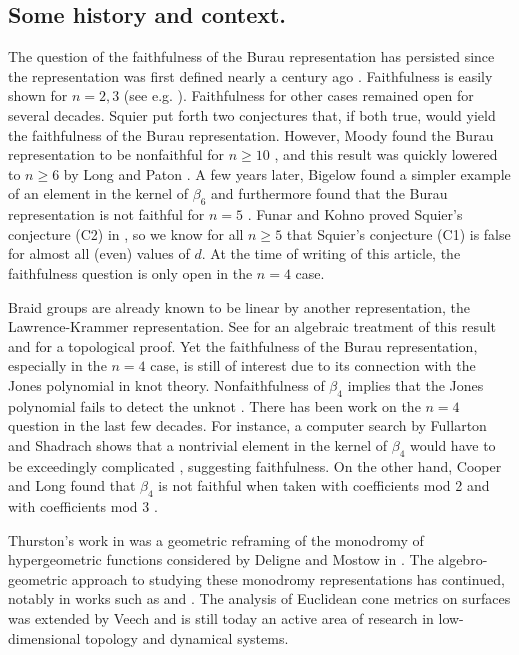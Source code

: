 \documentclass{amsart}
\begin{document}
    \subsection*{Some history and context.} The question of the faithfulness of the Burau representation has persisted since the representation was first defined nearly a century ago \cite{Burau1935UberVerkettungen}. Faithfulness is easily shown for $n=2,3$ (see e.g. \cite[Theorem 3.15]{Birman1975BraidsAM-82}). Faithfulness for other cases remained open for several decades. Squier put forth two conjectures \cite[(C1) and (C2)]{Squier1984TheUnitary} that, if both true, would yield the faithfulness of the Burau representation. However, Moody found the Burau representation to be nonfaithful for $n \geq 10$ \cite{Moody1993TheRepresentation}, and this result was quickly lowered to $n \geq 6$ by Long and Paton \cite{Long1993The6}. A few years later, Bigelow found a simpler example of an element in the kernel of $\beta_6$ and furthermore found that the Burau representation is not faithful for $n=5$ \cite{Bigelow1999The5}. Funar and Kohno proved Squier's conjecture (C2) in \cite{Funar2014OnUnity}, so we know for all $n \geq 5$ that Squier's conjecture (C1) is false for almost all (even) values of $d$. At the time of writing of this article, the faithfulness question is only open in the $n=4$ case.
    
    Braid groups are already known to be linear by another representation, the Lawrence-Krammer representation. See \cite{Krammer2002BraidLinear} for an algebraic treatment of this result and \cite{Bigelow2000BraidLinear} for a topological proof. Yet the faithfulness of the Burau representation, especially in the $n=4$ case, is still of interest due to its connection with the Jones polynomial in knot theory. Nonfaithfulness of $\beta_4$ implies that the Jones polynomial fails to detect the unknot \cite{Bigelow2002DoesUnknot,Ito2015APolynomials}. There has been work on the $n=4$ question in the last few decades. For instance, a computer search by Fullarton and Shadrach shows that a nontrivial element in the kernel of $\beta_4$ would have to be exceedingly complicated \cite{Fullarton2019ObservedRepresentation}, suggesting faithfulness. On the other hand, Cooper and Long found that $\beta_4$ is not faithful when taken with coefficients mod 2 and with coefficients mod 3 \cite{Cooper1997AmathbbZ_2,Cooper1998OnPrime}.
    
    Thurston's work in \cite{Thurston1998ShapesSphere} was a geometric reframing of the monodromy of hypergeometric functions considered by Deligne and Mostow in \cite{Deligne1986MonodromyMonodromy}. The algebro-geometric approach to studying these monodromy representations has continued, notably in works such as \cite{McMullen2013BraidTheory} and \cite{Venkataramana2014MonodromyLine}. The analysis of Euclidean cone metrics on surfaces was extended by Veech \cite{Veech1993FlatSurfaces} and is still today an active area of research in low-dimensional topology and dynamical systems.
    
\end{document}
